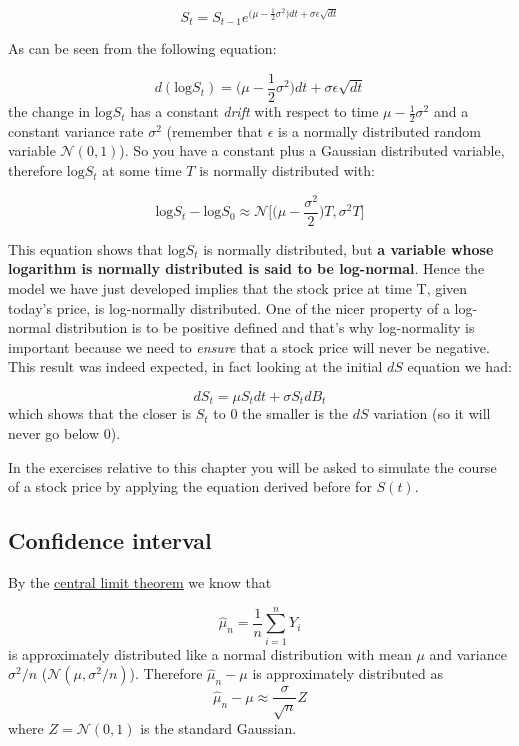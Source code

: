 \[S_t = S_{t-1}e^{\big(\mu - \frac{1}{2}\sigma^2\big)dt + \sigma\epsilon\sqrt{dt}}\]

    As can be seen from the following equation:

\[d(\textrm{log} S_t) = \big(\mu - \frac{1}{2}\sigma^2\big)dt + \sigma\epsilon\sqrt{dt}\]
the change in \(\textrm{log} S_t\) has a constant \emph{drift} with respect to time 
\(\mu - \frac{1}{2}\sigma^2\) and a constant variance rate \(\sigma^2\)
(remember that \(\epsilon\) is a normally distributed random variable
\(\mathcal{N}(0,1)\)). So you have a constant plus a Gaussian
distributed variable, therefore \(\textrm{log} S_t\) at some time \(T\)
is normally distributed with:

\[\textrm{log}S_t - \textrm{log}S_0 \approx\mathcal{N}\big[\big(\mu-\frac{\sigma^2}{2}\big)T, \sigma^2 T\big]\]

This equation shows that \(\textrm{log}S_t\) is normally distributed,
but \textbf{a variable whose logarithm is normally distributed is said
to be log-normal}. Hence the model we have just developed implies that
the stock price at time T, given today's price, is log-normally
distributed. One of the nicer property of a log-normal distribution is to be positive defined 
and that's why log-normality is important because we need to \emph{ensure} that a stock price
will never be negative. This result was indeed expected, in fact looking at the initial \(dS\) equation we
had:

\[dS_t = \mu S_tdt + \sigma S_tdB_t\]
which shows that the closer is \(S_t\) to 0 the smaller is the \(dS\)
variation (so it will never go below 0).

In the exercises relative to this chapter you will be asked to simulate the course of a stock price by applying the equation derived before for $S(t)$.

\subsection{Confidence interval}\label{confidence-interval}

By the \href{https://en.wikipedia.org/wiki/Central_limit_theorem}{central limit theorem} we know that 

\[ \hat{\mu}_n = \frac{1}{n}\sum_{i=1}^{n}Y_i\]
is approximately distributed like a normal distribution with mean $\mu$ and variance $\sigma^2 /n$ ($\mathcal{N}(\mu ,\sigma^2 /n)$). Therefore \( \hat{\mu}_n - \mu \) is approximately distributed as 
\[ \hat{\mu}_n - \mu \approx \frac{\sigma}{\sqrt{n}}Z \]
where $Z=\mathcal{N}(0, 1)$ is the standard Gaussian.

